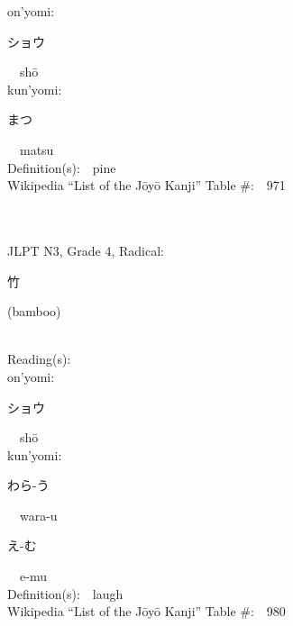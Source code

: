 \begin{multicols}{2}
{\hspace*{1em}}on'yomi:\ \ \\
{\hspace*{2em}}{\begin{CJK}{UTF8}{min} ショウ \end{CJK}}\ \ sh\=o\ \ \\
{\hspace*{1em}}kun'yomi:\ \ \\
{\hspace*{2em}}{\begin{CJK}{UTF8}{min} まつ \end{CJK}}\ \ matsu\ \ \\
Definition(s):\ \ pine \\
Wikipedia ``List of the J\=oy\=o Kanji'' Table \#:\ \ 971 \\
\ \ \\
{\fontsize{34pt}{40pt}  }\ \ \\  %
{JLPT N3, Grade 4, Radical:\ \ {\begin{CJK}{UTF8}{min} 竹 \end{CJK}} (bamboo) } \\
Reading(s):\ \ \\
{\hspace*{1em}}on'yomi:\ \ \\
{\hspace*{2em}}{\begin{CJK}{UTF8}{min} ショウ \end{CJK}}\ \ sh\=o\ \ \\
{\hspace*{1em}}kun'yomi:\ \ \\
{\hspace*{2em}}{\begin{CJK}{UTF8}{min} わら-う \end{CJK}}\ \ wara-u\ \ \\
{\hspace*{2em}}{\begin{CJK}{UTF8}{min} え-む \end{CJK}}\ \ e-mu\ \ \\
Definition(s):\ \ laugh \\
Wikipedia ``List of the J\=oy\=o Kanji'' Table \#:\ \ 980 \\
\ \ \\
{\fontsize{34pt}{40pt}  }\ \ \\  %

\end{multicols}
